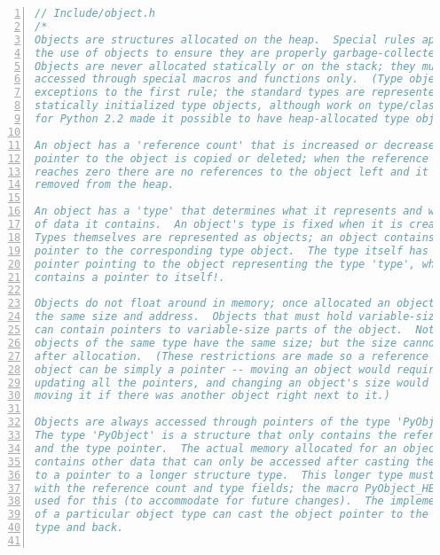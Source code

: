 \begin{lstlisting}[language=C, numbers=left, numbersep=1em, numberstyle=\footnotesize , breaklines=true]
// Include/object.h
/*
Objects are structures allocated on the heap.  Special rules apply to
the use of objects to ensure they are properly garbage-collected.
Objects are never allocated statically or on the stack; they must be
accessed through special macros and functions only.  (Type objects are
exceptions to the first rule; the standard types are represented by
statically initialized type objects, although work on type/class unification
for Python 2.2 made it possible to have heap-allocated type objects too).

An object has a 'reference count' that is increased or decreased when a
pointer to the object is copied or deleted; when the reference count
reaches zero there are no references to the object left and it can be
removed from the heap.

An object has a 'type' that determines what it represents and what kind
of data it contains.  An object's type is fixed when it is created.
Types themselves are represented as objects; an object contains a
pointer to the corresponding type object.  The type itself has a type
pointer pointing to the object representing the type 'type', which
contains a pointer to itself!.

Objects do not float around in memory; once allocated an object keeps
the same size and address.  Objects that must hold variable-size data
can contain pointers to variable-size parts of the object.  Not all
objects of the same type have the same size; but the size cannot change
after allocation.  (These restrictions are made so a reference to an
object can be simply a pointer -- moving an object would require
updating all the pointers, and changing an object's size would require
moving it if there was another object right next to it.)

Objects are always accessed through pointers of the type 'PyObject *'.
The type 'PyObject' is a structure that only contains the reference count
and the type pointer.  The actual memory allocated for an object
contains other data that can only be accessed after casting the pointer
to a pointer to a longer structure type.  This longer type must start
with the reference count and type fields; the macro PyObject_HEAD should be
used for this (to accommodate for future changes).  The implementation
of a particular object type can cast the object pointer to the proper
type and back.


\end{lstlisting}
